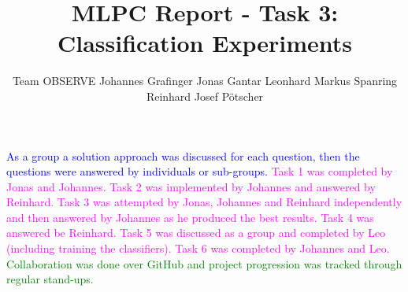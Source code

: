 \documentclass{article}
\title{MLPC Report  - Task 3: Classification Experiments}
\author{
  Team OBSERVE \AND
  Johannes Grafinger 
  \And
  Jonas Gantar 
  \And 
  Leonhard Markus Spanring 
  \And 
  Reinhard Josef Pötscher
}
\begin{document}
\maketitle

\begin{contributions}
  \textcolor{blue}{As a group a solution approach was discussed for each question, then the questions were answered by individuals or sub-groups.} 
  \textcolor{magenta}{Task 1 was completed by Jonas and Johannes. Task 2 was implemented by Johannes and answered by Reinhard. Task 3 was attempted by Jonas, Johannes and Reinhard independently and then answered by Johannes as he produced the best results. Task 4 was answered be Reinhard. Task 5 was discussed as a group and completed by Leo (including training the classifiers). Task 6 was completed by Johannes and Leo.} 
  \textcolor{green}{Collaboration was done over GitHub and project progression was tracked through regular stand-ups.} 
\end{contributions}












\end{document}
